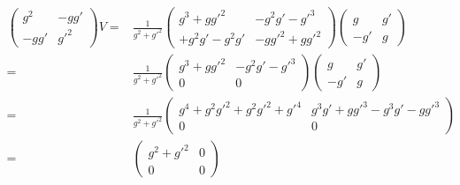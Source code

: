 \begin{frame}
\begin{align}
  \begin{pmatrix}
    g^2&-gg'\\
    -gg'&{g'}^2
  \end{pmatrix}V=&\frac{1}{g^2+{g'}^2}
  \begin{pmatrix}
    g^3+g{g'}^2 & -g^2g'-{g'}^3\\
+g^2g'-g^2g'    &-g{g'}^2+g{g'}^2
  \end{pmatrix}
\begin{pmatrix}
    g   & g'\\
    -g' & g
  \end{pmatrix}\nonumber\\
=&\frac{1}{g^2+{g'}^2}
  \begin{pmatrix}
    g^3+g{g'}^2 & -g^2g'-{g'}^3\\
    0   &0
  \end{pmatrix}
\begin{pmatrix}
    g   & g'\\
    -g' & g
  \end{pmatrix}\nonumber\\
=&\frac{1}{g^2+{g'}^2}
  \begin{pmatrix}
    g^4+g^2{g'}^2+g^2{g'}^2+{g'}^4 & g^3g'+g{g'}^3-g^3g'-g{g'}^3\\
    0    &0
  \end{pmatrix}\nonumber\\
=&\begin{pmatrix}
    g^2+{g'}^2 & 0\\
    0    &0
  \end{pmatrix}
\end{align}



\end{frame}
